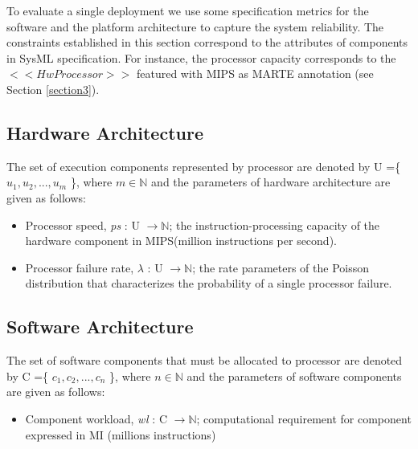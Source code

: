 \documentclass[3p,times,procedia,authoryear,round]{elsarticle}
\begin{document}
To evaluate a single deployment we use some specification metrics for the software and the platform architecture to capture the system reliability. The constraints established in this section correspond to the attributes of components in SysML specification. For instance, the processor capacity corresponds to the $<<HwProcessor>>$ featured with  MIPS as MARTE annotation (see Section \ref{section3}).


\subsection{Hardware Architecture}
The set of execution components represented by processor are denoted by U =\{ $u_{1}, u_{2},...,u_{m}$ \}, where $m \in \mathbb{N}$ and the parameters of hardware architecture are given as follows:

\begin{itemize}
    \item Processor speed, \emph{ps} : U $ \rightarrow \mathbb{N}$; the instruction-processing capacity of the hardware component in MIPS(million instructions per second). 
    \item Processor failure rate, \emph{$\lambda$} : U $ \rightarrow \mathbb{N}$; the rate parameters of the Poisson distribution that characterizes the probability of a single processor failure. 
\end{itemize}

\subsection{Software Architecture}
The set of software components that must be allocated to processor are denoted by C =\{ $c_{1}, c_{2},...,c_{n}$ \}, where $n \in \mathbb{N}$ and the parameters of software components are given as follows:

\begin{itemize}
    \item Component workload, \emph{wl} : C $ \rightarrow \mathbb{N}$; computational requirement for component expressed in MI (millions instructions)
\end{itemize}
\end{document}
